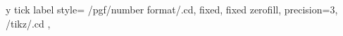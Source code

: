 y tick label style={
        /pgf/number format/.cd,
            fixed,
            fixed zerofill,
            precision=3,
        /tikz/.cd
    },
